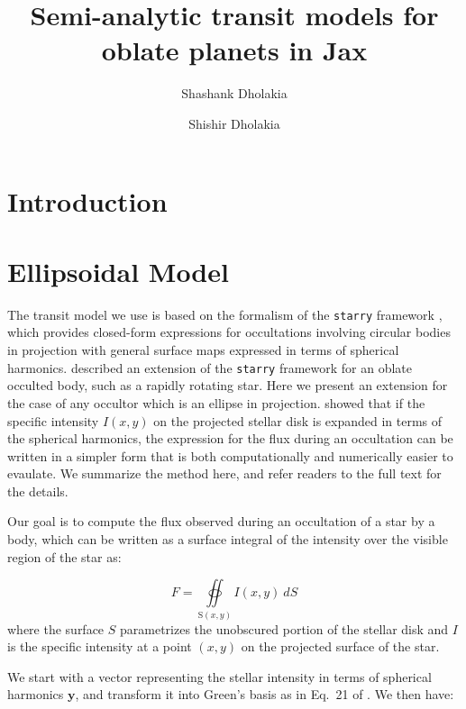 \documentclass[twocolumn]{aastex631}
\begin{document}
\title{Semi-analytic transit models for oblate planets in Jax}

\author{Shashank Dholakia} \author{Shishir Dholakia}

\begin{abstract}

\end{abstract}

\section{Introduction}
\label{sec:intro}


\section{Ellipsoidal Model}
\label{sec:model}
The transit model we use is based on the formalism of the \texttt{starry} framework \citep{starry2019}, which provides closed-form expressions for occultations involving circular bodies in projection with general surface maps expressed in terms of spherical harmonics. \citet{dholakia2022} described an extension of the \texttt{starry} framework for an oblate occulted body, such as a rapidly rotating star. Here we present an extension for the case of any occultor which is an ellipse in projection. \citet{starry2019} showed that if the specific intensity $I(x,y)$ on the projected stellar disk is expanded in terms of the spherical harmonics, the expression for the flux during an occultation can be written in a simpler form that is both computationally and numerically easier to evaulate. We summarize the method here, and refer readers to the full text for the details. 

Our goal is to compute the flux observed during an occultation of a star by a body, which can be written as a surface integral of the intensity over the visible region of the star as:

\begin{equation}
   F = \oiint\limits_{\mathrm{S}(x,y)} I(x,y) \ dS
\end{equation}
where the surface $S$ parametrizes the unobscured portion of the stellar disk and $I$ is the specific intensity at a point $(x,y)$ on the projected surface of the star.

We start with a vector representing the stellar intensity in terms of spherical harmonics $\mathbf{y}$, and transform it into Green's basis as in Eq.~21 of \citet{starry2019}. We then have: 
\end{document}
